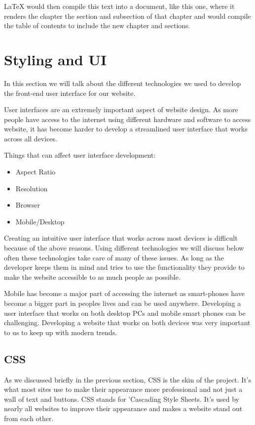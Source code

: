 LaTeX would then compile this text into a document, like this one, where it renders the chapter the section and subsection of that chapter and would compile the table of contents to include the new chapter and sections.

\section{Styling and UI}
In this section we will talk about the different technologies we used to develop the front-end user interface for our website. 

User interfaces are an extremely important aspect of website design. As more people have access to the internet using different hardware and software to access website, it has become harder to develop a streamlined user interface that works across all devices. 

Things that can affect user interface development:
\begin{itemize}
    \item Aspect Ratio
    \item Resolution
    \item Browser
    \item Mobile/Desktop
\end{itemize}

Creating an intuitive user interface that works across most devices is difficult because of the above reasons. Using different technologies we will discuss below often these technologies take care of many of these issues. As long as the developer keeps them in mind and tries to use the functionality they provide to make the website accessible to as much people as possible.

Mobile has become a major part of accessing the internet as smart-phones have become a bigger part in peoples lives and can be used anywhere. Developing a user interface that works on both desktop PCs and mobile smart phones can be challenging. Developing a website that works on both devices was very important to us to keep up with modern trends.

\subsection{CSS}
As we discussed briefly in the previous section, CSS is the  skin of the project. It's what most sites use to make their appearance more professional and not just a wall of text and buttons. CSS stands for 'Cascading Style Sheets. It's used by nearly all websites to improve their appearance and makes a website stand out from each other.

